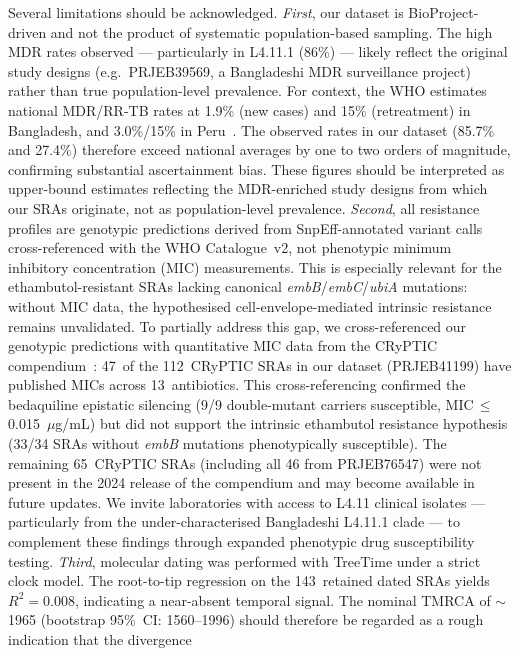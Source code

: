 \documentclass[11pt,a4paper]{article}
\newcommand{\lignee}[1]{\textsf{#1}}
\begin{document}
Several limitations should be acknowledged.
\emph{First}, our dataset is BioProject-driven and not the product of
systematic population-based sampling.  The high MDR rates observed ---
particularly in \lignee{L4.11.1} (86\%) --- likely reflect the original
study designs (e.g.\ PRJEB39569, a Bangladeshi MDR surveillance project)
rather than true population-level prevalence.  For context, the WHO
estimates national MDR/RR-TB rates at 1.9\% (new cases) and 15\%
(retreatment) in Bangladesh, and 3.0\%/15\% in Peru~\cite{who2024}.
The observed rates in our dataset (85.7\% and 27.4\%) therefore exceed
national averages by one to two orders of magnitude, confirming
substantial ascertainment bias.  These figures should be interpreted
as upper-bound estimates reflecting the MDR-enriched study designs
from which our SRAs originate, not as population-level prevalence.
\emph{Second}, all resistance profiles are genotypic predictions
derived from SnpEff-annotated variant calls cross-referenced with
the WHO Catalogue~v2, not phenotypic minimum
inhibitory concentration (MIC) measurements.  This is especially
relevant for the ethambutol-resistant SRAs lacking canonical
\textit{embB}/\textit{embC}/\textit{ubiA} mutations: without MIC data,
the hypothesised cell-envelope-mediated intrinsic resistance remains
unvalidated.  To partially address this gap, we cross-referenced our
genotypic predictions with quantitative MIC data from the CRyPTIC
compendium~\cite{cryptic2022}: 47~of the 112~CRyPTIC SRAs in our
dataset (PRJEB41199) have published MICs across 13~antibiotics.
This cross-referencing confirmed the bedaquiline epistatic silencing
(9/9 double-mutant carriers susceptible, MIC\,$\leq$\,0.015~$\mu$g/mL)
but did not support the intrinsic ethambutol resistance hypothesis
(33/34 SRAs without \textit{embB} mutations phenotypically susceptible).
The remaining 65~CRyPTIC SRAs (including all 46 from PRJEB76547)
were not present in the 2024 release of the compendium and may become
available in future updates.
We invite laboratories with access to \lignee{L4.11} clinical isolates
--- particularly from the under-characterised Bangladeshi
\lignee{L4.11.1} clade --- to complement these findings through
expanded phenotypic drug susceptibility testing.
\emph{Third}, molecular dating was performed with TreeTime under a
strict clock model.  The root-to-tip regression on the 143~retained
dated SRAs yields $R^2 = 0.008$, indicating a near-absent temporal
signal.  The nominal TMRCA of $\sim$1965 (bootstrap 95\%~CI: 1560--1996)
should therefore be regarded as a rough indication that the divergence
\end{document}
